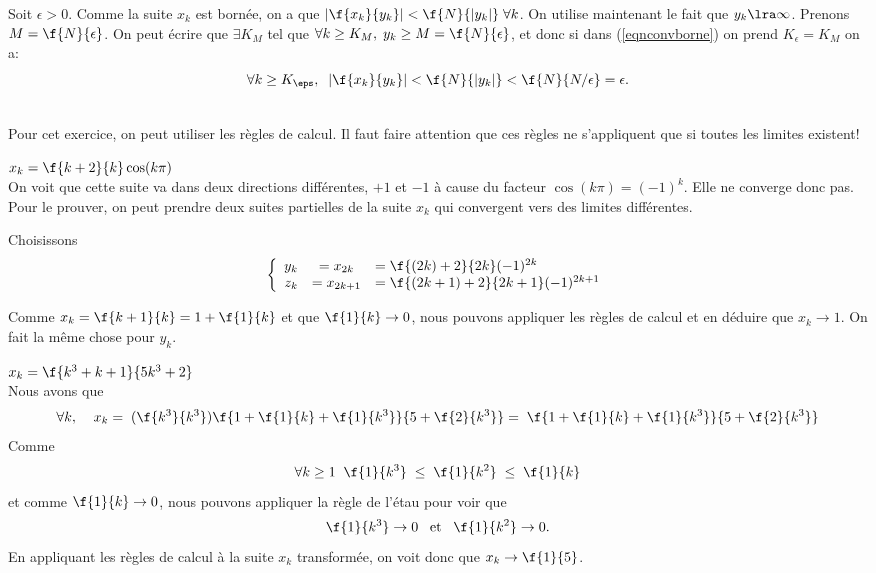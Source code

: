 \noindent Soit $\epsilon >0$. Comme la suite $x_k$ est bornée, on a que  $|\f{x_k}{y_k}|<\f{N}{|y_k|}\; \forall k$. On utilise maintenant le fait que $y_k \lra \infty$. Prenons $M=\f{N}{\epsilon}$. On peut écrire que $\exists K_M$ tel que $\forall k \geq K_M, \; y_k \geq M=\f{N}{\epsilon}$, et donc si dans (\ref{eqnconvborne}) on prend $K_\epsilon= K_M$ on a:\[\forall k \geq K_\eps,\; \; |\f{x_k}{y_k}|<\f{N}{|y_k|}<\f{N}{N/\epsilon}=\epsilon.\]



\\

\noindent Pour cet exercice, on peut utiliser les règles de calcul. Il faut faire attention que ces règles ne s'appliquent que si toutes les limites existent!

\vspace{0.5cm}
 $x_k = \f{k+2}{k}\cos(k\pi)$\\

\noindent On voit que cette suite va dans deux directions différentes, $+1$ et $-1$ à cause du facteur $\cos(k\pi)=(-1)^k$. Elle ne converge donc pas. Pour le prouver, on peut prendre deux suites partielles de la suite $x_k$ qui convergent vers des limites différentes. 

\noindent Choisissons \[\left\{ \begin{array}{rcl} y_k &= x_{2k}&= \f{(2k)+2}{2k}(-1)^{2k}\\
 							  z_k &= x_{2k+1} &= \f{(2k+1)+2}{2k+1} (-1)^{2k+1}\end{array}\right.\]

\noindent Comme $x_k =\f{k+1}{k}= 1+\f{1}{k}$	et que $\f{1}{k} \rightarrow  0$, nous pouvons appliquer les règles de calcul et en déduire que $x_k \rightarrow  1$. On fait la même chose pour $y_k$.				  


\vspace{0.5cm}
 $x_k = \f{k^3+k+1}{5k^3+2}$\\

\noindent Nous avons que \[\forall k, \;\;\;\;x_k =\; (\f{k^3}{k^3})\f{1+\f{1}{k} +\f{1}{k^3}}{5+\f{2}{k^3}}=\;\f{1+\f{1}{k} +\f{1}{k^3}}{5+\f{2}{k^3}} \]
Comme \[\forall k \geq 1\;\; \f{1}{k^3} \; \leq \;\f{1}{k^2}\; \leq \; \f{1}{k}\] et comme $\f{1}{k}\rightarrow 0$, nous pouvons appliquer la règle de l'étau pour voir que \[\f{1}{k^3} \rightarrow 0 \; \; \; {\rm et } \;\; \;\f{1}{k^2} \rightarrow 0.\]
En appliquant les règles de calcul à la suite $x_k$ transformée, on voit donc que $x_k \rightarrow  \f{1}{5}$.

